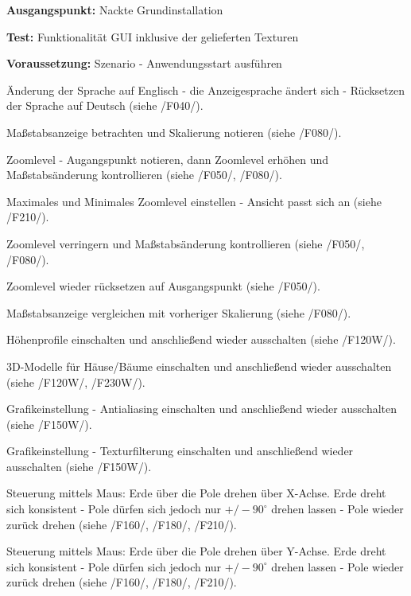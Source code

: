 \documentclass[10pt]{scrreprt}
\newenvironment{details}[1][6pt]{%
  \parskip#1 \parindent6mm \raggedright%
  \def\item{\par\ignorespaces\hangindent=5mm \hangafter1}}{%
  \par\ignorespaces}
\newcommand{\sfbf}[1]{\textbf{\sffamily #1}}
\newcommand{\ziel}[1]{{\fontsize{9.5}{11}\textsf{/#1/}}}
\newcommand{\ziellabel}{Z}
\newcommand{\muss}{\renewcommand{\labelenumi}{\textbf{\ziel{\ziellabel\numprint{\theenumi}0}}}}
\newcommand{\wunsch}{\renewcommand{\labelenumi}{\textbf{\ziel{\ziellabel\numprint{\theenumi}0W}}}}
\begin{document}
\vspace{1.0cm}
\begin{details}[2pt]
\item \sfbf{Ausgangspunkt:} Nackte Grundinstallation 
\item \sfbf{Test:} Funktionalität GUI inklusive der gelieferten Texturen 
\item \sfbf{Voraussetzung:} Szenario - Anwendungsstart ausführen
\end{details}
\vspace{2mm}
\begin{enumerate}[leftmargin = 2.2cm, resume]
\item Änderung der Sprache auf Englisch - die Anzeigesprache ändert sich - Rücksetzen der Sprache auf Deutsch (siehe \ziel{F040}).
\item Maßstabsanzeige betrachten und Skalierung notieren (siehe \ziel{F080}).
\item Zoomlevel - Augangspunkt notieren, dann Zoomlevel erhöhen und Maßstabsänderung kontrollieren (siehe \ziel{F050}, \ziel{F080}).
\item Maximales und Minimales Zoomlevel einstellen - Ansicht passt sich an (siehe \ziel{F210}).
\item Zoomlevel verringern und Maßstabsänderung kontrollieren (siehe \ziel{F050}, \ziel{F080}).
\item Zoomlevel wieder rücksetzen auf Ausgangspunkt (siehe \ziel{F050}).
\item Maßstabsanzeige vergleichen mit vorheriger Skalierung (siehe \ziel{F080}).
\wunsch
\item Höhenprofile einschalten und anschließend wieder ausschalten (siehe \ziel{F120W}).
\item 3D-Modelle für Häuse/Bäume einschalten und anschließend wieder ausschalten (siehe \ziel{F120W}, \ziel{F230W}).
\item Grafikeinstellung - Antialiasing einschalten und anschließend wieder ausschalten (siehe \ziel{F150W}).
\item Grafikeinstellung - Texturfilterung einschalten und anschließend wieder ausschalten (siehe \ziel{F150W}).
\muss
\item Steuerung mittels Maus: Erde über die Pole drehen über X-Achse. Erde dreht sich konsistent - Pole dürfen sich jedoch nur $+/- 90^\circ$ drehen lassen - Pole wieder zurück drehen (siehe \ziel{F160}, \ziel{F180}, \ziel{F210}).
\item Steuerung mittels Maus: Erde über die Pole drehen über Y-Achse. Erde dreht sich konsistent - Pole dürfen sich jedoch nur $+/- 90^\circ$ drehen lassen - Pole wieder zurück drehen (siehe \ziel{F160}, \ziel{F180}, \ziel{F210}).

\end{enumerate}
\end{document}
